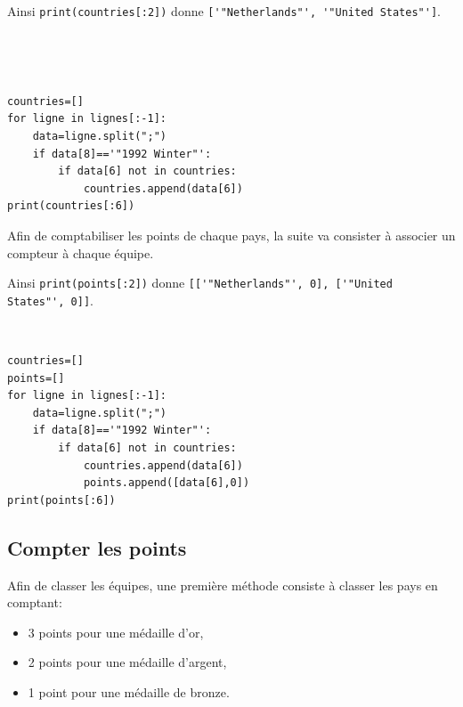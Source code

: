Ainsi \verb?print(countries[:2])? donne \verb?['"Netherlands"', '"United States"']?.

~\

\begin{solution}~\ \\
\begin{verbatim}
countries=[]
for ligne in lignes[:-1]:
    data=ligne.split(";")
    if data[8]=='"1992 Winter"':
        if data[6] not in countries:
            countries.append(data[6])
print(countries[:6])
\end{verbatim}
\end{solution}

Afin de comptabiliser les points de chaque pays, la suite va consister à associer un compteur à chaque équipe.


Ainsi \verb?print(points[:2])? donne \verb?[['"Netherlands"', 0], ['"United States"', 0]]?.

\begin{solution}~\ \\
\begin{verbatim}
countries=[]
points=[]
for ligne in lignes[:-1]:
    data=ligne.split(";")
    if data[8]=='"1992 Winter"':
        if data[6] not in countries:
            countries.append(data[6])
            points.append([data[6],0])
print(points[:6])
\end{verbatim}
\end{solution}

\subsection{Compter les points}

Afin de classer les équipes, une première méthode consiste à classer les pays en comptant:
\begin{itemize}
 \item 3 points pour une médaille d'or,
 \item 2 points pour une médaille d'argent,
 \item 1 point pour une médaille de bronze.
\end{itemize}


